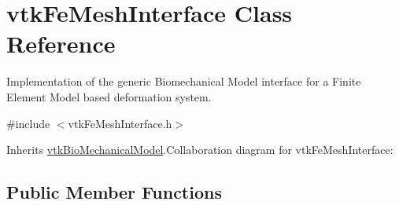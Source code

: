 \hypertarget{classvtkFeMeshInterface}{
\section{vtkFeMeshInterface Class Reference}
\label{classvtkFeMeshInterface}
}


Implementation of the generic Biomechanical Model interface for a Finite Element Model based deformation system.  


{\ttfamily \#include $<$vtkFeMeshInterface.h$>$}

Inherits \hyperlink{classvtkBioMechanicalModel}{vtkBioMechanicalModel}.Collaboration diagram for vtkFeMeshInterface:\subsection*{Public Member Functions}
